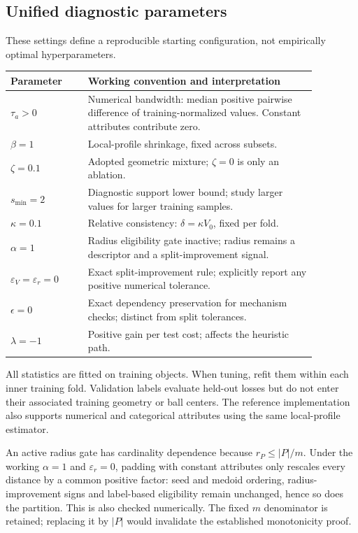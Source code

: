\subsection{Unified diagnostic parameters}
These settings define a reproducible starting configuration, not
empirically optimal hyperparameters.
\begin{center}
\begin{tabular}{p{0.22\linewidth}p{0.65\linewidth}}
\hline
Parameter & Working convention and interpretation\\
\hline
$\tau_a>0$ & Numerical bandwidth: median positive pairwise difference of
training-normalized values. Constant attributes contribute zero.\\
$\beta=1$ & Local-profile shrinkage, fixed across subsets.\\
$\zeta=0.1$ & Adopted geometric mixture; $\zeta=0$ is only an ablation.\\
$s_{\min}=2$ & Diagnostic support lower bound; study larger values for
larger training samples.\\
$\kappa=0.1$ & Relative consistency: $\delta=\kappa V_0$, fixed per fold.\\
$\alpha=1$ & Radius eligibility gate inactive; radius remains a descriptor
and a split-improvement signal.\\
$\varepsilon_V=\varepsilon_r=0$ & Exact split-improvement rule; explicitly
report any positive numerical tolerance.\\
$\epsilon=0$ & Exact dependency preservation for mechanism checks;
distinct from split tolerances.\\
$\lambda=-1$ & Positive gain per test cost; affects the heuristic path.\\
\hline
\end{tabular}
\end{center}
All statistics are fitted on training objects. When tuning, refit them
within each inner training fold. Validation labels evaluate held-out losses
but do not enter their associated training geometry or ball centers.
The reference implementation also supports numerical and categorical
attributes using the same local-profile estimator.

An active radius gate has cardinality dependence because $r_P\le|P|/m$.
Under the working $\alpha=1$ and $\varepsilon_r=0$, padding with constant
attributes only rescales every distance by a common positive factor:
seed and medoid ordering, radius-improvement signs and label-based
eligibility remain unchanged, hence so does the partition. This is also
checked numerically. The fixed $m$ denominator is retained; replacing it
by $|P|$ would invalidate the established monotonicity proof.


